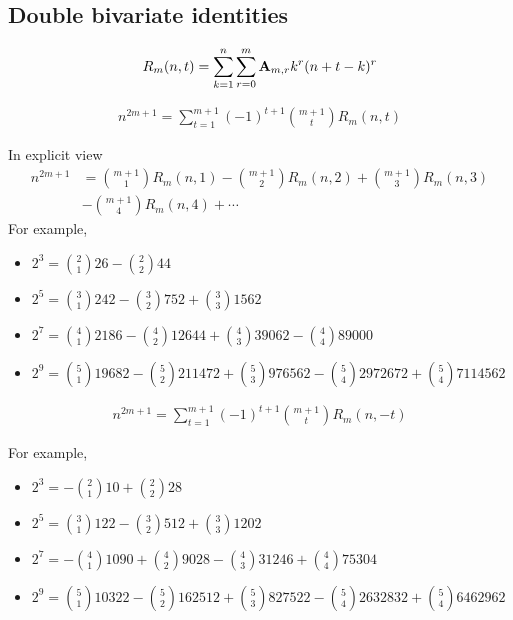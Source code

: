 \subsection{Double bivariate identities}\label{subsec:double-bivariate-identities}
\begin{definition}
    \begin{align*}
        R_{m}(n,t) = \sum_{k=1}^{n} \sum_{r=0}^{m} {\mathbf{A}} \sb{m,r} k^r (n+t-k)^r
    \end{align*}
\end{definition}
\begin{proposition}
    \begin{align*}
        n^{2m+1} = \sum_{t=1}^{m+1} (-1)^{t+1} \binom{m+1}{t} R_{m} (n, t)
    \end{align*}
\end{proposition}
In explicit view
\begin{align*}
    n^{2m+1}
    &=  \binom{m+1}{1} R_{m} (n, 1) - \binom{m+1}{2} R_{m} (n, 2) + \binom{m+1}{3} R_{m} (n, 3) \\
    &- \binom{m+1}{4} R_{m} (n, 4) + \cdots
\end{align*}
For example,
\begin{itemize}
    \item $2^3 = \binom{2}{1} 26 - \binom{2}{2} 44$
    \item $2^5 = \binom{3}{1} 242 - \binom{3}{2} 752 + \binom{3}{3} 1562$
    \item $2^7 = \binom{4}{1} 2186 - \binom{4}{2} 12644 + \binom{4}{3} 39062 - \binom{4}{4} 89000$
    \item $2^9 = \binom{5}{1} 19682 - \binom{5}{2} 211472 + \binom{5}{3} 976562 - \binom{5}{4} 2972672 + \binom{5}{4} 7114562$
\end{itemize}
\begin{proposition}
    \begin{align*}
        n^{2m+1} = \sum_{t=1}^{m+1} (-1)^{t+1} \binom{m+1}{t} R_{m} (n, -t)
    \end{align*}
\end{proposition}
For example,
\begin{itemize}
    \item $2^3 = -\binom{2}{1}10 + \binom{2}{2} 28$
    \item $2^5 = \binom{3}{1} 122 - \binom{3}{2} 512 + \binom{3}{3} 1202$
    \item $2^7 = -\binom{4}{1} 1090 + \binom{4}{2} 9028 - \binom{4}{3} 31246 + \binom{4}{4} 75304$
    \item $2^9 = \binom{5}{1} 10322 - \binom{5}{2} 162512 + \binom{5}{3} 827522 - \binom{5}{4} 2632832 + \binom{5}{4} 6462962$
\end{itemize}
